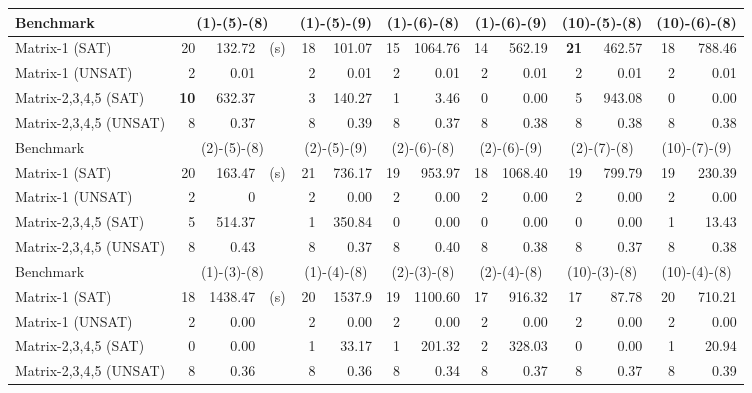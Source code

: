 \documentclass[runningheads,a4paper,oribibl]{llncs}
\begin{document}
\begin{table}[t]
\centering
\begin{tabular}{ | l | r | r  r | r | r  | r | r | r | r | r | r |r | r |}
\hline
    \multicolumn{1}{|l|}{Benchmark} & 
    \multicolumn{3}{c|}{(1)-(5)-(8)} & \multicolumn{2}{c|}{(1)-(5)-(9)} & 
    \multicolumn{2}{c|}{(1)-(6)-(8)} & \multicolumn{2}{c|}{(1)-(6)-(9)} &
    \multicolumn{2}{c|}{(10)-(5)-(8)} & \multicolumn{2}{c|}{(10)-(6)-(8)} 
\\
\hline
 Matrix-1 (SAT) & 20 & 132.72 & (s) & 18 & 101.07 & 15 & 1064.76 & 14 & 562.19 & \textbf{21} & 462.57 & 18 & 788.46 
\\
\hline
 Matrix-1 (UNSAT) & 2 & 0.01 && 2 & 0.01 &  2 & 0.01 & 2 & 0.01 & 2 & 0.01 
& 2 & 0.01 
\\
\hline
 Matrix-2,3,4,5 (SAT) & {\bf 10} & 632.37 && 3 & 140.27 & 1 & 3.46 & 0 & 0.00 & 5 & 943.08 & 0 & 0.00
\\
\hline
 Matrix-2,3,4,5 (UNSAT) & 8 & 0.37 && 8 & 0.39 & 8 & 0.37 & 8 & 0.38 & 8 & 0.38 & 8 & 0.38 
\\
\hline
\hline
    \multicolumn{1}{|l|}{Benchmark} & 
    \multicolumn{3}{c|}{(2)-(5)-(8)} & \multicolumn{2}{c|}{(2)-(5)-(9)} & 
    \multicolumn{2}{c|}{(2)-(6)-(8)} & \multicolumn{2}{c|}{(2)-(6)-(9)} & 
    \multicolumn{2}{c|}{(2)-(7)-(8)} & \multicolumn{2}{c|}{(10)-(7)-(9)} \\
\hline
 Matrix-1 (SAT) & 20 & 163.47 & (s) & 21 & 736.17 & 19 & 953.97 & 18 & 
1068.40 & 19 & 799.79 & 19 & 230.39 
\\
\hline
 Matrix-1 (UNSAT) &     2 & 0 && 2 & 0.00 & 2 & 0.00 & 2 & 0.00 & 2 & 0.00 & 2 & 0.00 
\\
\hline
 Matrix-2,3,4,5 (SAT) &     5 & 514.37 && 1 & 350.84 & 0 & 0.00 & 0 & 0.00 & 0 & 0.00 & 1 & 13.43
\\
\hline
 Matrix-2,3,4,5 (UNSAT) &     8 & 0.43 && 8 & 0.37 & 8 & 0.40 & 8 & 0.38 & 8 & 0.37 & 8 & 0.38 
\\
\hline
\hline
    \multicolumn{1}{|l|}{Benchmark} & 
    \multicolumn{3}{c|}{(1)-(3)-(8)} & \multicolumn{2}{c|}{(1)-(4)-(8)} & 
    \multicolumn{2}{c|}{(2)-(3)-(8)} & \multicolumn{2}{c|}{(2)-(4)-(8)} & 
    \multicolumn{2}{c|}{(10)-(3)-(8)} & \multicolumn{2}{c|}{(10)-(4)-(8)} \\
\hline
 Matrix-1 (SAT) & 18 & 1438.47 & (s) & 20 & 1537.9 & 19 & 1100.60 & 17 & 916.32 & 17 & 87.78 & 20 & 710.21 
\\
\hline
 Matrix-1 (UNSAT) & 2 & 0.00 && 2 & 0.00 & 2 & 0.00 & 2 & 0.00 & 2 & 0.00 & 2 & 0.00 
\\
\hline
 Matrix-2,3,4,5 (SAT) & 0 & 0.00 && 1 & 33.17 & 1 & 201.32 & 2 & 328.03 & 0 & 0.00 & 1 & 20.94 
\\
\hline
 Matrix-2,3,4,5 (UNSAT) & 8 & 0.36 && 8 & 0.36 & 8 & 0.34 & 8 & 0.37 & 8 & 0.37 & 8 & 0.39 
\\
\hline
\end{tabular}


\end{table}
\end{document}
